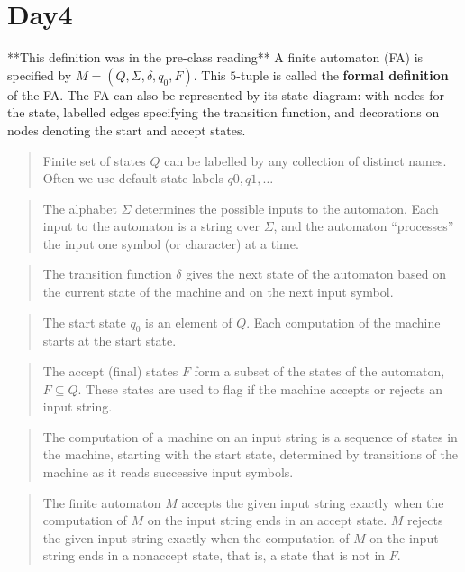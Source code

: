\documentclass[12pt, oneside]{article}
\begin{document}
\vfill \vfill
\section*{Day4}



**This definition was in the pre-class reading**
A finite automaton (FA) is specified by  $M = (Q, \Sigma, \delta, q_0, F)$.
This $5$-tuple is called the {\bf formal definition} of the FA. The FA can also 
be represented by its state diagram: with nodes for the state, labelled edges specifying the 
transition function, and decorations on nodes denoting the start and accept states.

\begin{quote}
Finite set of states $Q$ can be labelled by any collection of distinct names. Often
we use default state labels $q0, q1, \ldots$ 
\end{quote}

\begin{quote}  
The alphabet $\Sigma$ determines the possible inputs to the automaton. 
Each input to the automaton is a string over  $\Sigma$, and the automaton ``processes'' the input
one symbol (or character) at a time.
\end{quote}

\begin{quote}
The transition function $\delta$ gives the next state of the automaton based on the current state of 
the machine and on the next input symbol.
\end{quote}

\begin{quote}
The start state $q_0$ is an element of $Q$.  Each computation of the machine starts at the  start  state.
\end{quote}

\begin{quote}
The accept (final) states $F$ form a subset of the states of the automaton, $F \subseteq  Q$. 
These states are used to flag if the machine accepts or rejects an input string.
\end{quote}


\begin{quote}
The computation of a machine on an input string is a sequence of states
in the machine,  starting with the start state, determined by transitions 
of the machine as it reads successive input symbols.
\end{quote}

\begin{quote}
The finite automaton $M$ accepts the given input string exactly when the computation of $M$ on the input string
ends in an accept state. $M$ rejects the given input string exactly when the computation of 
$M$ on the input string ends in a nonaccept state, that is, a state that is not in $F$.
\end{quote}
\end{document}
